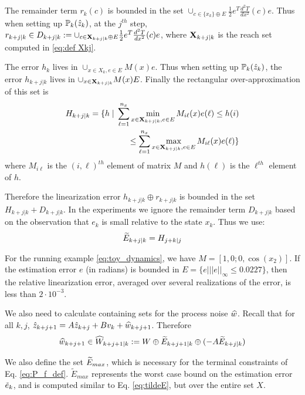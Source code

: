 The remainder term $r_k(c)$ is bounded in the set $\cup_{c \in \{x_k\} \oplus  E}   \frac{1}{2}e^T\frac{d^2T}{dx^2}(c)e$.
Thus when setting up $\mathbb{P}_{k}(\hat{z}_{k})$, at the $j^{th}$ step, 
$r_{k+j|k} \in D_{k+j|k} := \cup_{c \in \mathbf{X}_{k+j|k} \oplus  E}   \frac{1}{2}e^T\frac{d^2T}{dx^2}(c)e $,
where $\mathbf{X}_{k+j|k}$ is the reach set computed in \eqref{eq:def Xkj}.

The error $h_{k}$ lives in 
$\cup_{x\in X_{k}, e \in E}M(x)e$.
Thus when setting up $\mathbb{P}_{k}(\hat{z}_{k})$, the error $h_{k+j|k}$ lives in $\cup_{x \in \mathbf{X}_{k+j|k}}M(x)E$.
Finally the rectangular over-approximation of this set is 
\begin{eqnarray}
\label{eq:H}
H_{k+j|k} = \{h \;|\; \sum_{\ell=1}^{n_x} \min_{x \in \mathbf{X}_{k+j|k}, e \in E} M_{i\ell}(x)e(\ell)  \leq h(i) 
\nonumber 
\\
\leq \sum_{\ell=1}^{n_x} \max_{x \in \mathbf{X}_{k+j|k}, e \in E} M_{i\ell}(x)e(\ell) \}
\end{eqnarray}
where $M_{i\ell}$ is the $(i,\ell)^{th}$ element of matrix $M$ and $h(\ell)$ is the $\ell^{th}$ element of $h$.

Therefore the linearization error $h_{k+j|k} \oplus r_{k+j|k}$ is bounded in the set $H_{k+j|k} + D_{k+j|k}$. 
In the experiments we ignore the remainder term $D_{k+j|k}$ based on the observation that $e_k$ is small relative to the state $x_k$. Thus we use:
\begin{eqnarray}
\label{eq:tildeE}
\widetilde{E}_{k+j|k} = H_{j+k|j}
\end{eqnarray}

\begin{exmp}
For the running example \eqref{eq:toy_dynamics}, we have $M = [1 ,  0;0 ,\cos(x_2)]$. 
If the estimation error $e$ (in radians) is bounded in $E = \lbrace e| ||e||_{\infty} \leq 0.0227\rbrace$,
then the relative linearization error, averaged over several realizations of the error, is less than $2\cdot 10^{-3}$.
\exmend
\end{exmp}

We also need to calculate containing sets for the process noise $\widehat{w}$.
Recall that for all $k,j$, 
$\hat{z}_{k+j+1} =  A\hat{z}_{k+j} + Bv_k + \widehat{w}_{k+j+1}$.
Therefore 
\begin{equation}
\label{eq:What}
\widehat{w}_{k+j+1} \in \widehat{W}_{k+j+1|k} := W \oplus \widetilde{E}_{k+j+1|k} \oplus(-A\widetilde{E}_{k+j|k})
\end{equation}

We also define the set $\widetilde{E}_{max}$, which is necessary for the terminal constraints of Eq. \eqref{eq:P_f_def}. $\tilde{E}_{max}$ represents the worst case bound on the estimation error $\tilde{e}_{k}$, and is computed similar to Eq. \eqref{eq:tildeE}, but over the entire set $X$. %

